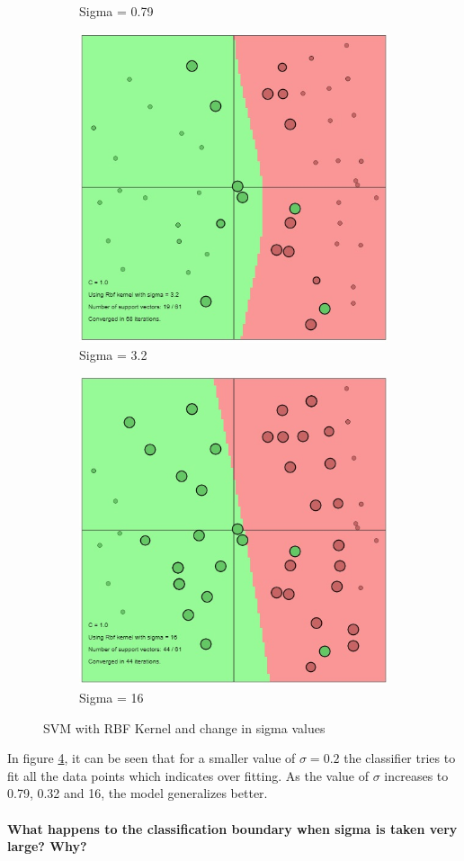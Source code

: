 {\begin{figure}[!ht]
\begin{subfigure}{.255\textwidth}
		\caption{Sigma = 0.79}
		\label{fig:RBF_sig0.79}
	\end{subfigure}%
	\begin{subfigure}{.255\textwidth}
		\centering
		\includegraphics[width=0.8\linewidth]{Exercise1/Report/RBF_sigma(3.2).jpg}
		\caption{Sigma = 3.2}
		\label{fig:RBF_sig3.2}
	\end{subfigure}%
	\begin{subfigure}{.255\textwidth}
		\centering
		\includegraphics[width=0.8\linewidth]{Exercise1/Report/RBF_sigma(16).jpg}
		\caption{Sigma = 16}
		\label{fig:RBF_sig16}
	\end{subfigure}%
	\caption{SVM with RBF Kernel and change in sigma values}
	\label{fig:RBF_sig}
\end{figure}
In figure \ref{fig:RBF_sig}, it can be seen that for a smaller value of $\sigma = 0.2$
the classifier tries to fit all the data points which indicates over fitting. As the value of $\sigma$ increases to 0.79, 0.32 and 16, the model generalizes better. \\\\
\textbf{What happens to the classification boundary when sigma is taken very large? Why?}

}
